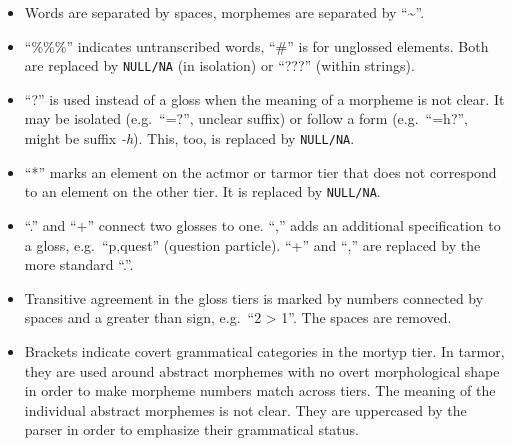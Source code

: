 \documentclass[a4paper, 11pt]{book}
\begin{document}
\begin{itemize}
	\item Words are separated by spaces, morphemes are separated by “\textasciitilde”. %
	\item “\%\%\%” indicates untranscribed words, “\#” is for unglossed elements. Both are replaced by \texttt{NULL/NA} (in isolation) or “???” (within strings).
	\item “?” is used instead of a gloss when the meaning of a morpheme is not clear. It may be isolated (e.g.\ “=?”, unclear suffix) or follow a form 
		(e.g.\ “=h?”, might be suffix \emph{-h}). This, too, is replaced by \texttt{NULL/NA}.
	\item “*” marks an element on the actmor or tarmor tier that does not correspond to an element on the other tier. It is replaced by \texttt{NULL/NA}. %
	\item “.” and “+” connect two glosses to one. “,” adds an additional specification to a gloss, e.g.\ “p,quest” (question particle). “+” and “,” 
		 are replaced by the more standard “.”. %
	\item Transitive agreement in the gloss tiers is marked by numbers connected by spaces and a greater than sign, e.g.\ “2 > 1”. The spaces are removed.
	\item Brackets indicate covert grammatical categories in the mortyp tier. In tarmor, they are used around abstract morphemes with no overt 
		morphological shape in order to make morpheme numbers match across tiers. The meaning of the individual abstract morphemes is not clear. 
		They are uppercased by the parser in order to emphasize their grammatical status. %

\end{itemize}
\end{document}
